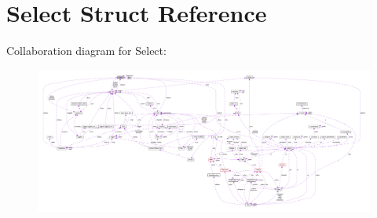 \hypertarget{struct_select}{\section{Select Struct Reference}
\label{struct_select}
}


Collaboration diagram for Select\-:\nopagebreak
\begin{figure}[H]
\begin{center}
\leavevmode
\includegraphics[width=350pt]{struct_select__coll__graph}
\end{center}
\end{figure}
